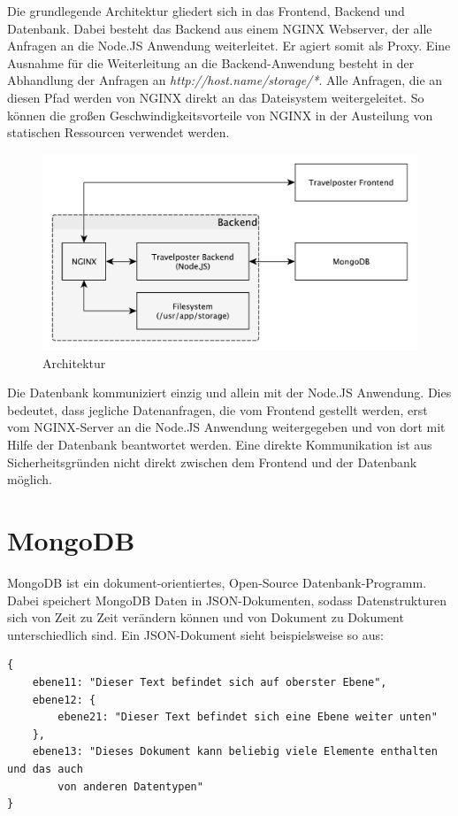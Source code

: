 \documentclass[12pt,a4paper]{report}
\begin{document}
Die grundlegende  Architektur gliedert sich in das Frontend, Backend und Datenbank. Dabei besteht das Backend aus einem NGINX Webserver, der alle Anfragen an die Node.JS Anwendung weiterleitet. Er agiert somit als Proxy. Eine Ausnahme für die Weiterleitung an die Backend-Anwendung besteht in der Abhandlung der Anfragen an \textit{http://host.name/storage/*}. Alle Anfragen, die an diesen Pfad werden von NGINX direkt an das Dateisystem weitergeleitet. So können die großen Geschwindigkeitsvorteile von NGINX in der Austeilung von statischen Ressourcen verwendet werden.

\begin{figure}[h]
	\centering
	\includegraphics[width=0.7\linewidth]{Bilder_Doku/architecture_overview}
	\caption[]{Architektur}
\end{figure}

Die Datenbank kommuniziert einzig und allein mit der Node.JS Anwendung. Dies bedeutet, dass jegliche Datenanfragen, die vom Frontend gestellt werden, erst vom NGINX-Server an die Node.JS Anwendung weitergegeben und von dort mit Hilfe der Datenbank beantwortet werden. Eine direkte Kommunikation ist aus Sicherheitsgründen nicht direkt zwischen dem Frontend und der Datenbank möglich.

\section{MongoDB}
MongoDB ist ein dokument-orientiertes, Open-Source Datenbank-Programm. Dabei speichert MongoDB Daten in JSON-Dokumenten, sodass Datenstrukturen sich von Zeit zu Zeit verändern können und von Dokument zu Dokument unterschiedlich sind. Ein JSON-Dokument sieht beispielsweise so aus:
\begin{verbatim}
{
    ebene11: "Dieser Text befindet sich auf oberster Ebene",
    ebene12: { 
        ebene21: "Dieser Text befindet sich eine Ebene weiter unten"
    },
    ebene13: "Dieses Dokument kann beliebig viele Elemente enthalten und das auch
        von anderen Datentypen"
}
\end{verbatim}
\end{document}
